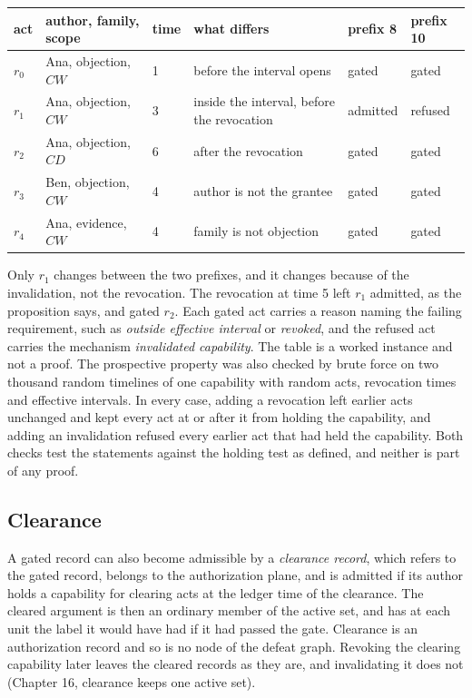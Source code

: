 \documentclass[11pt]{article}
\begin{document}
\begin{center}
\small
\begin{tabularx}{\textwidth}{@{}l l l X l l@{}}
\toprule
act & author, family, scope & time & what differs & prefix 8 & prefix 10\\
\midrule
$r_0$ & Ana, objection, $CW$ & 1 & before the interval opens & gated & gated\\
$r_1$ & Ana, objection, $CW$ & 3 & inside the interval, before the revocation & admitted & refused\\
$r_2$ & Ana, objection, $CD$ & 6 & after the revocation & gated & gated\\
$r_3$ & Ben, objection, $CW$ & 4 & author is not the grantee & gated & gated\\
$r_4$ & Ana, evidence, $CW$ & 4 & family is not objection & gated & gated\\
\bottomrule
\end{tabularx}
\end{center}

Only $r_1$ changes between the two prefixes, and it changes because of the invalidation, not the revocation. The revocation at time 5 left $r_1$ admitted, as the proposition says, and gated $r_2$. Each gated act carries a reason naming the failing requirement, such as \emph{outside effective interval} or \emph{revoked}, and the refused act carries the mechanism \emph{invalidated capability}. The table is a worked instance and not a proof. The prospective property was also checked by brute force on two thousand random timelines of one capability with random acts, revocation times and effective intervals. In every case, adding a revocation left earlier acts unchanged and kept every act at or after it from holding the capability, and adding an invalidation refused every earlier act that had held the capability. Both checks test the statements against the holding test as defined, and neither is part of any proof.

\subsection{Clearance}

A gated record can also become admissible by a \emph{clearance record}, which refers to the gated record, belongs to the authorization plane, and is admitted if its author holds a capability for clearing acts at the ledger time of the clearance. The cleared argument is then an ordinary member of the active set, and has at each unit the label it would have had if it had passed the gate. Clearance is an authorization record and so is no node of the defeat graph. Revoking the clearing capability later leaves the cleared records as they are, and invalidating it does not (Chapter 16, clearance keeps one active set).
\end{document}
